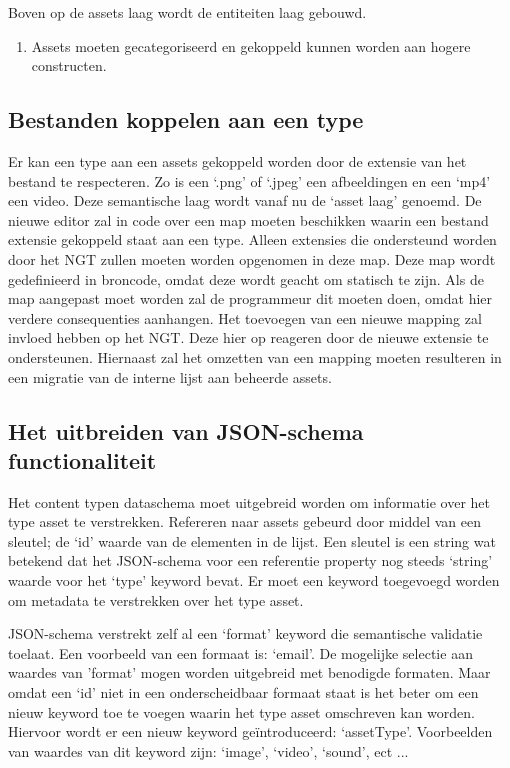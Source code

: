 Boven op de assets laag wordt de entiteiten laag gebouwd.

\begin{enumerate}[resume]
    \item Assets moeten gecategoriseerd en gekoppeld kunnen worden aan hogere constructen.
\end{enumerate}

\subsection{Bestanden koppelen aan een type}
Er kan een type aan een assets gekoppeld worden door de extensie van het bestand te respecteren. Zo is een ‘.png’ of ‘.jpeg’ een afbeeldingen en een ‘mp4’ een video. Deze semantische laag wordt vanaf nu de ‘asset laag’ genoemd. De nieuwe editor zal in code over een map moeten beschikken waarin een bestand extensie gekoppeld staat aan een type. Alleen extensies die ondersteund worden door het NGT zullen moeten worden opgenomen in deze map. Deze map wordt gedefinieerd in broncode, omdat deze wordt geacht om statisch te zijn. Als de map aangepast moet worden zal de programmeur dit moeten doen, omdat hier verdere consequenties aanhangen. Het toevoegen van een nieuwe mapping zal invloed hebben op het NGT. Deze hier op reageren door de nieuwe extensie te ondersteunen. Hiernaast zal het omzetten van een mapping moeten resulteren in een migratie van de interne lijst aan beheerde assets.

\subsection{Het uitbreiden van JSON-schema functionaliteit}
Het content typen dataschema moet uitgebreid worden om informatie over het type asset te verstrekken. Refereren naar assets gebeurd door middel van een sleutel; de ‘id’ waarde van de elementen in de lijst. Een sleutel is een string wat betekend dat het JSON-schema voor een referentie property nog steeds ‘string’ waarde voor het ‘type’ keyword bevat. Er moet een keyword toegevoegd worden om metadata te verstrekken over het type asset.

JSON-schema verstrekt zelf al een ‘format’ keyword die semantische validatie toelaat. Een voorbeeld van een formaat is: ‘email’\cite{Droettboom2016}. De mogelijke selectie aan waardes van 'format' mogen worden uitgebreid met benodigde formaten. Maar omdat een ‘id’ niet in een onderscheidbaar formaat staat is het beter om een nieuw keyword toe te voegen waarin het type asset omschreven kan worden. Hiervoor wordt er een nieuw keyword geïntroduceerd: ‘assetType’. Voorbeelden van waardes van dit keyword zijn: ‘image’, ‘video’, ‘sound’, ect ...

